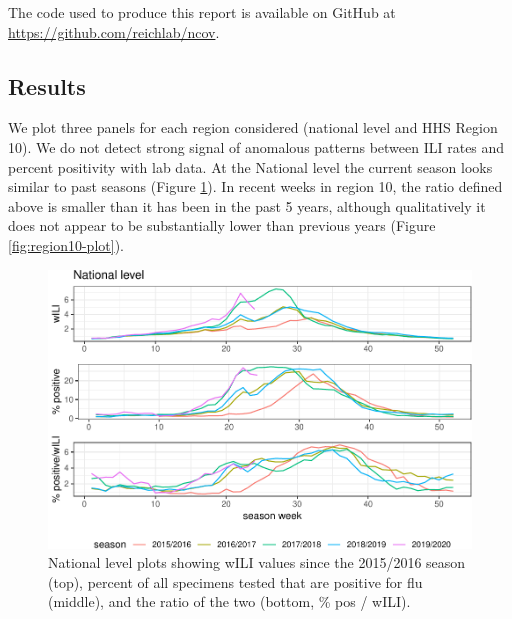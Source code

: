 \documentclass[]{article}
\begin{document}
The code used to produce this report is available on GitHub at
\url{https://github.com/reichlab/ncov}.

\hypertarget{results}{%
\subsection{Results}\label{results}}

We plot three panels for each region considered (national level and HHS
Region 10). We do not detect strong signal of anomalous patterns between
ILI rates and percent positivity with lab data. At the National level
the current season looks similar to past seasons (Figure
\ref{fig:national-plot}). In recent weeks in region 10, the ratio
defined above is smaller than it has been in the past 5 years, although
qualitatively it does not appear to be substantially lower than previous
years (Figure \ref{fig:region10-plot}).

\begin{figure}
\centering
\includegraphics{ili-labtest-report_files/figure-latex/national-plot-1.pdf}
\caption{\label{fig:national-plot}National level plots showing wILI
values since the 2015/2016 season (top), percent of all specimens tested
that are positive for flu (middle), and the ratio of the two (bottom, \%
pos / wILI).}
\end{figure}
\end{document}
